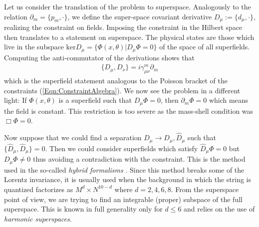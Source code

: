 \documentclass[12pt]{article}
\begin{document}
Let us consider the translation of the problem to superspace. Analogously to the relation $\partial_m=\{p_m, \cdot\}$, we define the super-space covariant derivative $D_\mu:=\{d_\mu, \cdot\}$, realizing the constraint on fields. Imposing the constraint in the Hilbert space then translates to a statement on superspace. The physical states are those which live in the subspace $\mathrm{ker}D_\mu=\{\Phi(x, \theta)|D_\mu \Phi=0\}$ of the space of all superfields. Computing the anti-commutator of the derivations shows that 
\begin{eqnarray}
\{D_\mu, D_\nu\}= i \gamma^m_{\mu\nu} \partial_m
\end{eqnarray}
which is the superfield statement analogous to the Poisson bracket of the constraints (\ref{Eqn:ConstraintAlgebra}). We now see the problem in a different light: If $\Phi(x,\theta)$ is a superfield such that $D_\mu \Phi=0$, then $\partial_m \Phi=0$ which means the field is constant. This restriction is too severe as the mass-shell condition was $\Box \Phi=0$. 

Now suppose that we could find a separation $D_\mu\to D_\mu , \hat D_\mu$ such that $\{\hat D_\mu, \hat  D_\mu \}=0$. Then we could consider superfields which satisfy $\hat D_\mu \Phi=0$ but $D_\mu \Phi\neq 0$ thus avoiding a contradiction with the constraint. This is the method used in the so-called {\em hybrid formalisms} \cite{Berkovits:1996bf}. Since this method breaks some of the Lorentz invariance, it is usually used  when the background in which the string is quantized factorizes as $M^d\times N^{10-d}$ where $d=2, 4, 6, 8$. From the superspace point of view, we are trying to find an integrable (proper) subspace of the full superspace. This is known in full generality only for $d\leq 6$ and relies on the use of {\em harmonic superspaces}. 

\end{document}
